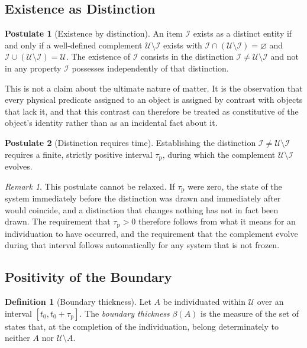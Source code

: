\documentclass[11pt,twocolumn,a4paper]{article}
\theoremstyle{plain}
\theoremstyle{definition}
\newtheorem{definition}[theorem]{Definition}
\newtheorem{postulate}{Postulate}
\theoremstyle{remark}
\newtheorem{remark}[theorem]{Remark}
\newcommand{\Univ}{\mathcal{U}}
\newcommand{\Item}{\mathcal{I}}
\newcommand{\thick}{\beta}
\newcommand{\taup}{\tau_{\mathrm{p}}}
\begin{document}
\subsection{Existence as Distinction}

\begin{postulate}[Existence by distinction]
\label{post:negation}
An item $\Item$ exists as a distinct entity if and only if a well-defined
complement $\Univ \setminus \Item$ exists with $\Item \cap (\Univ\setminus
\Item) = \varnothing$ and $\Item \cup (\Univ\setminus\Item) = \Univ$. The
existence of $\Item$ consists in the distinction $\Item \neq
\Univ\setminus\Item$ and not in any property $\Item$ possesses
independently of that distinction.
\end{postulate}

This is not a claim about the ultimate nature of matter. It is the
observation that every physical predicate assigned to an object is assigned
by contrast with objects that lack it, and that this contrast can therefore
be treated as constitutive of the object's identity rather than as an
incidental fact about it.

\begin{postulate}[Distinction requires time]
\label{post:duration}
Establishing the distinction $\Item \neq \Univ\setminus\Item$ requires a
finite, strictly positive interval $\taup$, during which the complement
$\Univ\setminus\Item$ evolves.
\end{postulate}

\begin{remark}
This postulate cannot be relaxed. If $\taup$ were zero, the state of the
system immediately before the distinction was drawn and immediately after
would coincide, and a distinction that changes nothing has not in fact been
drawn. The requirement that $\taup > 0$ therefore follows from what it means
for an individuation to have occurred, and the requirement that the
complement evolve during that interval follows automatically for any system
that is not frozen.
\end{remark}

\subsection{Positivity of the Boundary}

\begin{definition}[Boundary thickness]
\label{def:thickness}
Let $A$ be individuated within $\Univ$ over an interval $[t_0,
t_0+\taup]$. The \emph{boundary thickness} $\thick(A)$ is the measure of the
set of states that, at the completion of the individuation, belong
determinately to neither $A$ nor $\Univ\setminus A$.
\end{definition}
\end{document}
